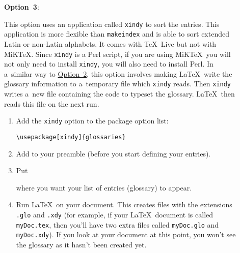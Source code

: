 \documentclass{nlctdoc}
\makeatletter
\newcommand*{\optionlabel}[1]{%
 \@glstarget{option#1}{}\textbf{Option~#1}}
\newcommand*{\opt}[1]{\hyperlink{option#1}{Option~#1}}
\makeatother
\begin{document}
\begin{description}
\item[]\optionlabel3:

   This option uses an application called
   \texttt{xindy} to sort the entries. This application is more
   flexible than \texttt{makeindex} and is able to sort extended
   Latin or non-Latin alphabets. It comes with \TeX~Live but not
   with MiK\TeX. Since \texttt{xindy} is a Perl script, if you are
   using MiK\TeX\ you will not only need to install \texttt{xindy}, you
   will also need to install Perl. In a~similar way to \opt2, this 
   option involves making \LaTeX\ write the glossary information to 
   a~temporary file which \texttt{xindy} reads. Then \texttt{xindy} 
   writes a~new file containing the code to typeset the glossary. 
   \LaTeX\ then reads this file on the next run.

   \begin{enumerate}
     \item Add the \texttt{xindy} option to the 
package option list:
\begin{verbatim}
\usepackage[xindy]{glossaries}
\end{verbatim}

     \item Add  to your preamble (before you start
     defining your entries).

    \item Put
\begin{definition}
\end{definition}
    where you want your list of entries (glossary) to appear.

    \item Run \LaTeX\ on your document. This creates files with the
    extensions \texttt{.glo} and \texttt{.xdy} (for example, if your 
    \LaTeX\ document is called \texttt{myDoc.tex}, then you'll have 
    two extra files called \texttt{myDoc.glo} and \texttt{myDoc.xdy}).
    If you look at your document at this point, you won't see the 
    glossary as it hasn't been created yet.


\end{enumerate}
\end{description}
\end{document}
